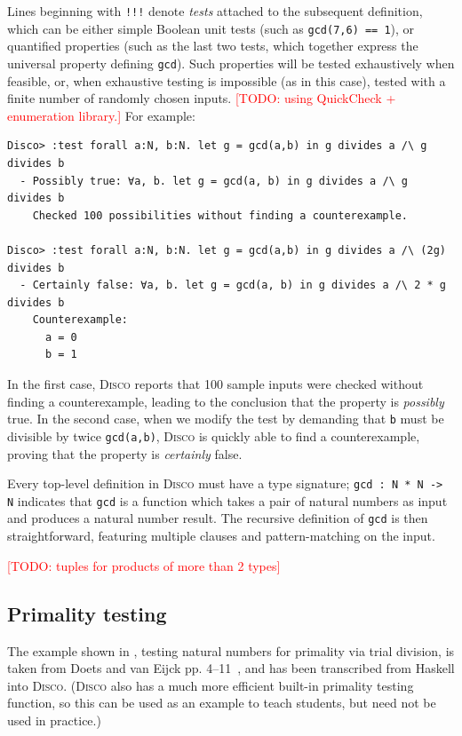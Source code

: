 \documentclass[submission,copyright,creativecommons]{eptcs}
\newcommand{\disco}{\textsc{Disco}\xspace}
\newcommand{\pref}[1]{\prettyref{#1}}
\newcommand{\todo}[1]{\textcolor{red}{[TODO: #1]}}
\newcommand{\todo}[1]{}
\begin{document}
Lines beginning with \texttt{!!!} denote \emph{tests} attached to the
subsequent definition, which can be either simple Boolean unit tests
(such as \verb|gcd(7,6) == 1|), or quantified properties (such as the
last two tests, which together express the universal property defining
\verb|gcd|).  Such properties will be tested exhaustively when
feasible, or, when exhaustive testing is impossible (as in this case),
tested with a finite number of randomly chosen inputs. \todo{using
QuickCheck + enumeration library.}  For example:

\begin{verbatim}
Disco> :test forall a:N, b:N. let g = gcd(a,b) in g divides a /\ g divides b
  - Possibly true: ∀a, b. let g = gcd(a, b) in g divides a /\ g divides b
    Checked 100 possibilities without finding a counterexample.

Disco> :test forall a:N, b:N. let g = gcd(a,b) in g divides a /\ (2g) divides b
  - Certainly false: ∀a, b. let g = gcd(a, b) in g divides a /\ 2 * g divides b
    Counterexample:
      a = 0
      b = 1

\end{verbatim}

In the first case, \disco reports that 100 sample inputs were checked
without finding a counterexample, leading to the conclusion that the
property is \emph{possibly} true.  In the second case, when we modify
the test by demanding that \verb|b| must be divisible by twice
\verb|gcd(a,b)|, \disco is quickly able to find a counterexample,
proving that the property is \emph{certainly} false.

Every top-level definition in \disco must have a type signature;
\verb|gcd : N * N -> N| indicates that \verb|gcd| is a function which
takes a pair of natural numbers as input and produces a natural number
result.  The recursive definition of \verb|gcd| is then
straightforward, featuring multiple clauses and pattern-matching on
the input.

\todo{tuples for products of more than 2 types}

\subsection{Primality testing}
\label{sec:primetest}

The example shown in \pref{lst:prime}, testing natural numbers for
primality via trial division, is taken from Doets and van Eijck
pp. 4--11~\cite{Doets:2004}, and has been transcribed from Haskell
into \disco. (\disco also has a much more efficient built-in primality
testing function, so this can be used as an example to teach students,
but need not be used in practice.)
\end{document}
